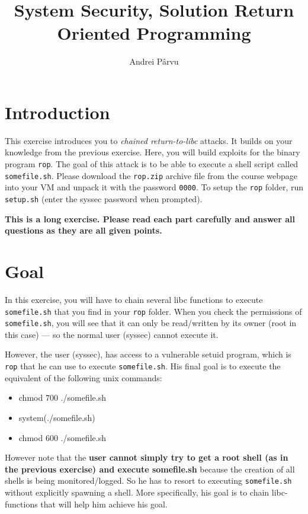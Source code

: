\documentclass[a4paper,11pt]{article}
\title{System Security,
\ifsolution Solution \else \fi
Return Oriented Programming}
\author{Andrei Pârvu}
\begin{document}
\maketitle


\section*{Introduction}

This exercise introduces you to \textit{chained return-to-libc} attacks. It
builds on your knowledge from the previous exercise. Here, you will build
exploits for the binary program {\tt rop}.  The goal of this attack is to be
able to execute a shell script called {\tt somefile.sh}. Please download the
\texttt{rop.zip} archive file from the course webpage into your VM and unpack
it with the password \texttt{0000}. To setup the \texttt{rop} folder, run
\texttt{setup.sh} (enter the syssec password when prompted).

\textbf{This is a long exercise. Please read each part carefully and answer all
  questions as they are all given points.}


\section{Goal}
In this exercise, you will have to chain several libc functions
to execute \texttt{somefile.sh} that you find in your \texttt{rop} folder. 
When you check the permissions of \texttt{somefile.sh}, you will see that it
can only be read/written by its owner (root in this case) --- so the normal user
(syssec) cannot execute it. 

However, the user (syssec), has access to a vulnerable setuid program, which is
\texttt{rop} that he can use to execute \texttt{somefile.sh}. His final goal is
to execute the equivalent of the following unix commands:

\begin{itemize}
\item chmod 700 ./somefile.sh
\item system(./somefile.sh)
\item chmod 600 ./somefile.sh
\end{itemize}

However note that the \textbf{user cannot simply try to get a root shell (as in the
previous exercise) and execute somefile.sh} because the creation of all shells is
being monitored/logged. So he has to resort to executing \texttt{somefile.sh}
without explicitly spawning a shell. More specifically, his goal is to chain
libc-functions that will help him achieve his goal.
\end{document}
